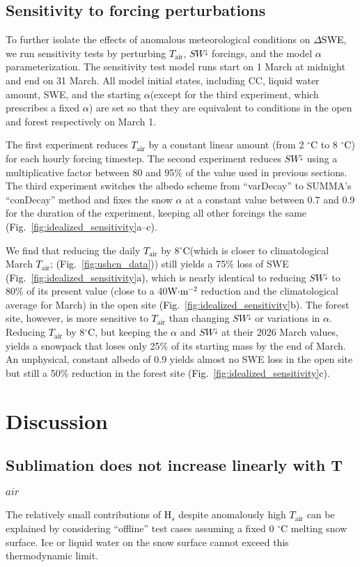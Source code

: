 \documentclass[draft]{agujournal2019}
\newcommand{\fig}[2]{\textcolor{black}{(Fig.~\ref{#1}{#2})}}   %
\newcommand{\tair}{\textcolor{black}{$T_{\mathrm{air}}$}\xspace}
\newcommand{\hs}{\textcolor{black}{H$_s$}\xspace}
\newcommand{\swdn}{\textcolor{black}{$SW^{\downarrow}$}\xspace}
\newcommand{\albedo}{\textcolor{black}{$\alpha$}\xspace}
\newcommand{\dswe}{\textcolor{black}{$\Delta$SWE}\xspace}
\newcommand{\wmsq}{\textcolor{black}{W$\cdot$m$^{-2}$}\xspace}
\newcommand{\degrc}{\textcolor{black}{$^\circ$C}\xspace}
\begin{document}
\subsection{Sensitivity to forcing perturbations}
To further isolate the effects of anomalous meteorological conditions on \dswe, we run sensitivity tests by perturbing \tair, \swdn forcings, and the model \albedo parameterization.
The sensitivity test model runs start on 1 March at midnight and end on 31 March.
All model initial states, including CC, liquid water amount, SWE, and the starting \albedo (except for the third experiment, which prescribes a fixed \albedo) are set so that they are equivalent to conditions in the open and forest respectively on March 1.

The first experiment reduces \tair by a constant linear amount (from 2 \degrc to 8 \degrc) for each hourly forcing timestep.
The second experiment reduces \swdn using a multiplicative factor between 80 and 95\% of the value used in previous sections.
The third experiment switches the albedo scheme from ``varDecay'' to SUMMA's ``conDecay'' method and fixes the snow \albedo at a constant value between 0.7 and 0.9 for the duration of the experiment, keeping all other forcings the same \fig{fig:idealized_sensitivity}{a--c}.

We find that reducing the daily \tair by 8\degrc (which is closer to climatological March \tair; \fig{fig:ushcn_data}{}) still yields a 75\% loss of SWE \fig{fig:idealized_sensitivity}{a}, which is nearly identical to reducing \swdn to 80\% of its present value (close to a 40\wmsq reduction and the climatological average for March) in the open site \fig{fig:idealized_sensitivity}{b}.
The forest site, however, is more sensitive to \tair than changing \swdn or variations in \albedo. 
Reducing \tair by 8\degrc, but keeping the \albedo and \swdn at their 2026 March values, yields a snowpack that loses only 25\% of its starting mass by the end of March. 
An unphysical, constant albedo of 0.9 yields almost no SWE loss in the open site but still a 50\% reduction in the forest site \fig{fig:idealized_sensitivity}{c}.


\section{Discussion}
\subsection{Sublimation does not increase linearly with T$_{air}$}
The relatively small contributions of \hs despite anomalously high \tair can be explained by considering ``offline'' test cases assuming a fixed 0 \degrc melting snow surface. 
Ice or liquid water on the snow surface cannot exceed this thermodynamic limit.
\end{document}
